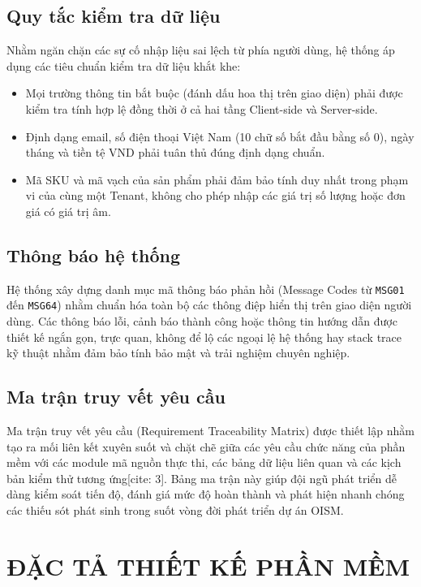 \documentclass[12pt,a4paper]{report}
\begin{document}
	\section{Quy tắc kiểm tra dữ liệu}
	Nhằm ngăn chặn các sự cố nhập liệu sai lệch từ phía người dùng, hệ thống áp dụng các tiêu chuẩn kiểm tra dữ liệu khắt khe:
	\begin{itemize}
		\item Mọi trường thông tin bắt buộc (đánh dấu hoa thị trên giao diện) phải được kiểm tra tính hợp lệ đồng thời ở cả hai tầng Client-side và Server-side.
		\item Định dạng email, số điện thoại Việt Nam (10 chữ số bắt đầu bằng số 0), ngày tháng và tiền tệ VND phải tuân thủ đúng định dạng chuẩn.
		\item Mã SKU và mã vạch của sản phẩm phải đảm bảo tính duy nhất trong phạm vi của cùng một Tenant, không cho phép nhập các giá trị số lượng hoặc đơn giá có giá trị âm.
	\end{itemize}
	
	\section{Thông báo hệ thống}
	Hệ thống xây dựng danh mục mã thông báo phản hồi (Message Codes từ \texttt{MSG01} đến \texttt{MSG64}) nhằm chuẩn hóa toàn bộ các thông điệp hiển thị trên giao diện người dùng. Các thông báo lỗi, cảnh báo thành công hoặc thông tin hướng dẫn được thiết kế ngắn gọn, trực quan, không để lộ các ngoại lệ hệ thống hay stack trace kỹ thuật nhằm đảm bảo tính bảo mật và trải nghiệm chuyên nghiệp.
	
	\section{Ma trận truy vết yêu cầu}
	Ma trận truy vết yêu cầu (Requirement Traceability Matrix) được thiết lập nhằm tạo ra mối liên kết xuyên suốt và chặt chẽ giữa các yêu cầu chức năng của phần mềm với các module mã nguồn thực thi, các bảng dữ liệu liên quan và các kịch bản kiểm thử tương ứng[cite: 3]. Bảng ma trận này giúp đội ngũ phát triển dễ dàng kiểm soát tiến độ, đánh giá mức độ hoàn thành và phát hiện nhanh chóng các thiếu sót phát sinh trong suốt vòng đời phát triển dự án OISM.
	
	\chapter{ĐẶC TẢ THIẾT KẾ PHẦN MỀM}
\end{document}
